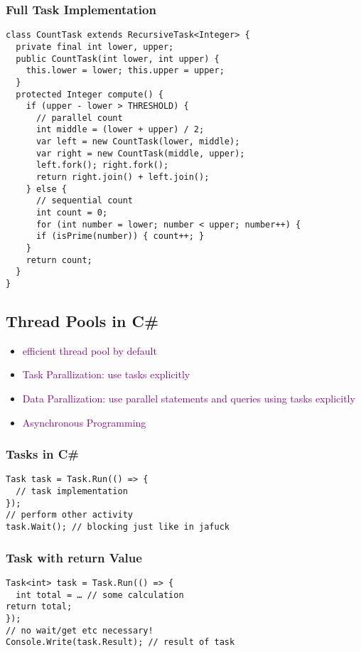 \documentclass[main.tex,fontsize=8pt,paper=a4,paper=portrait,DIV=calc,]{scrartcl}
\begin{document}
\subsubsection{Full Task Implementation}
\begin{lstlisting}
class CountTask extends RecursiveTask<Integer> {
  private final int lower, upper;
  public CountTask(int lower, int upper) {
    this.lower = lower; this.upper = upper;
  }
  protected Integer compute() {
    if (upper - lower > THRESHOLD) {
      // parallel count
      int middle = (lower + upper) / 2;
      var left = new CountTask(lower, middle);
      var right = new CountTask(middle, upper);
      left.fork(); right.fork();
      return right.join() + left.join();
    } else {
      // sequential count
      int count = 0;
      for (int number = lower; number < upper; number++) {
      if (isPrime(number)) { count++; }
    }
    return count;
  }
}
\end{lstlisting}

\lstset{
    language=C#,
    style=code,
}

\subsection{Thread Pools in C\#}
\begin{itemize}
\item \textcolor{purple}{efficient thread pool by default}
\item \textcolor{purple}{Task Parallization: use tasks explicitly}
\item \textcolor{purple}{Data Parallization: use parallel statements and queries using tasks explicitly}
\item \textcolor{purple}{Asynchronous Programming}
\end{itemize} 
\subsubsection{Tasks in C\#}
\begin{lstlisting}
Task task = Task.Run(() => {
  // task implementation
});
// perform other activity
task.Wait(); // blocking just like in jafuck
\end{lstlisting}

\subsubsection{Task with return Value}
\begin{lstlisting}
Task<int> task = Task.Run(() => {
  int total = … // some calculation
return total;
});
// no wait/get etc necessary!
Console.Write(task.Result); // result of task
\end{lstlisting}
\end{document}
